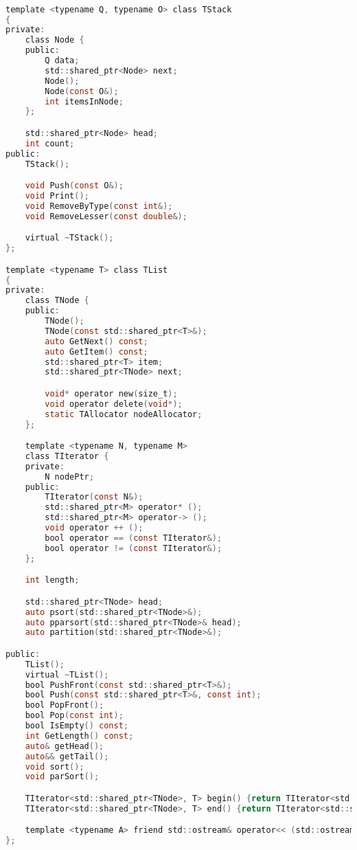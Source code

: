 \begin{lstlisting}[language=C]

template <typename Q, typename O> class TStack
{
private:
    class Node {
    public:
        Q data;
        std::shared_ptr<Node> next;
        Node();
        Node(const O&);
        int itemsInNode;
    };

    std::shared_ptr<Node> head;
    int count;
public:
    TStack();

    void Push(const O&);
    void Print();
    void RemoveByType(const int&);
    void RemoveLesser(const double&);

    virtual ~TStack();
};

template <typename T> class TList
{
private:
    class TNode {
    public:
        TNode();
        TNode(const std::shared_ptr<T>&);
        auto GetNext() const;
        auto GetItem() const;
        std::shared_ptr<T> item;
        std::shared_ptr<TNode> next;

        void* operator new(size_t);
        void operator delete(void*);
        static TAllocator nodeAllocator;
    };

    template <typename N, typename M>
    class TIterator {
    private:
        N nodePtr;
    public:
        TIterator(const N&);
        std::shared_ptr<M> operator* ();
        std::shared_ptr<M> operator-> ();
        void operator ++ ();
        bool operator == (const TIterator&);
        bool operator != (const TIterator&);
    };

    int length;

    std::shared_ptr<TNode> head;
    auto psort(std::shared_ptr<TNode>&);
    auto pparsort(std::shared_ptr<TNode>& head);
    auto partition(std::shared_ptr<TNode>&);

public:
    TList();
    virtual ~TList();
    bool PushFront(const std::shared_ptr<T>&);
    bool Push(const std::shared_ptr<T>&, const int);
    bool PopFront();
    bool Pop(const int);
    bool IsEmpty() const;
    int GetLength() const;
    auto& getHead();
    auto&& getTail();
    void sort();
    void parSort();

    TIterator<std::shared_ptr<TNode>, T> begin() {return TIterator<std::shared_ptr<TNode>, T>(head->next);};
    TIterator<std::shared_ptr<TNode>, T> end() {return TIterator<std::shared_ptr<TNode>, T>(nullptr);};

    template <typename A> friend std::ostream& operator<< (std::ostream&, TList<A>&);
};

\end{lstlisting}


